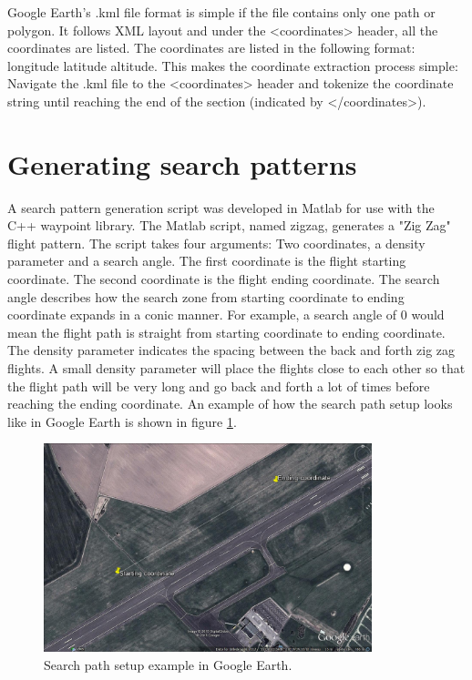 Google Earth's .kml file format is simple if the file contains only one path or polygon.
It follows XML layout and under the <coordinates> header, all the coordinates are listed.
The coordinates are listed in the following format: longitude latitude altitude.
This makes the coordinate extraction process simple: Navigate the .kml file to the <coordinates> header and tokenize the coordinate string until reaching the end of the section (indicated by </coordinates>).

\section{Generating search patterns}
A search pattern generation script was developed in Matlab for use with the C++ waypoint library.
The Matlab script, named zigzag, generates a "Zig Zag" flight pattern.
The script takes four arguments: Two coordinates, a density parameter and a search angle.
The first coordinate is the flight starting coordinate. The second coordinate is the flight ending
coordinate.
The search angle describes how the search zone from starting coordinate to ending coordinate
expands in a conic manner.
For example, a search angle of 0 would mean the flight path is straight from starting coordinate to
ending coordinate.
The density parameter indicates the spacing between the back and forth zig zag flights.
A small density parameter will place the flights close to each other so that
the flight path will be very long and go back and forth a lot of times before reaching the ending
coordinate.
An example of how the search path setup looks like in Google Earth is shown in figure
\ref{fig:googlepath}.
\begin{figure}[ht]
	\centering
	\includegraphics[width=0.85\textwidth]{Images/googlepath}
	\caption[Search path setup.]{Search path setup example in Google Earth.}
	\label{fig:googlepath}
\end{figure}

